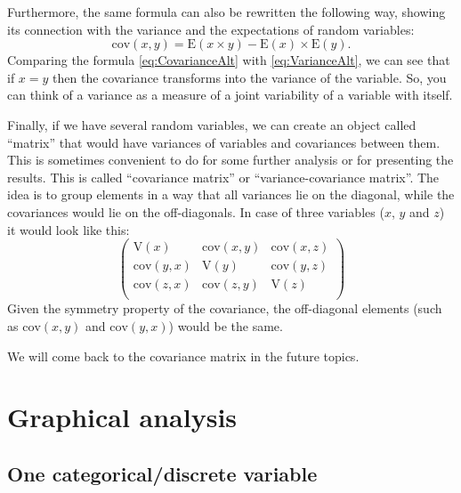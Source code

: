 \documentclass[
]{book}
\theoremstyle{definition}
\theoremstyle{definition}
\theoremstyle{definition}
\theoremstyle{definition}
\theoremstyle{remark}
\begin{document}
Furthermore, the same formula can also be rewritten the following way, showing its connection with the variance and the expectations of random variables:
\begin{equation}
    \mathrm{cov}(x,y)= \mathrm{E}(x \times y) - \mathrm{E}(x) \times \mathrm{E}(y).
    \label{eq:CovarianceAlt}
\end{equation}
Comparing the formula \eqref{eq:CovarianceAlt} with \eqref{eq:VarianceAlt}, we can see that if \(x=y\) then the covariance transforms into the variance of the variable. So, you can think of a variance as a measure of a joint variability of a variable with itself.

Finally, if we have several random variables, we can create an object called ``matrix'' that would have variances of variables and covariances between them. This is sometimes convenient to do for some further analysis or for presenting the results. This is called ``covariance matrix'' or ``variance-covariance matrix''. The idea is to group elements in a way that all variances lie on the diagonal, while the covariances would lie on the off-diagonals. In case of three variables (\(x\), \(y\) and \(z\)) it would look like this:
\begin{equation}
    \begin{pmatrix}
        \mathrm{V}(x) & \mathrm{cov}(x,y) & \mathrm{cov}(x,z) \\
        \mathrm{cov}(y,x) & \mathrm{V}(y) & \mathrm{cov}(y,z) \\
        \mathrm{cov}(z,x) & \mathrm{cov}(z,y) & \mathrm{V}(z)\\
    \end{pmatrix}
    \label{eq:CovarMat}
\end{equation}
Given the symmetry property of the covariance, the off-diagonal elements (such as \(\mathrm{cov}(x,y)\) and \(\mathrm{cov}(y,x)\)) would be the same.

We will come back to the covariance matrix in the future topics.

\section{Graphical analysis}\label{dataAnalysisGraphical}

\subsection{One categorical/discrete variable}\label{one-categoricaldiscrete-variable}
\end{document}
